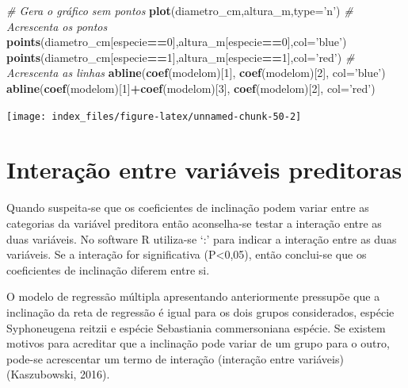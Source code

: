 \documentclass[12pt,brazil,oneside]{book}
\newenvironment{Shaded}{\begin{snugshade}}{\end{snugshade}}
\newcommand{\CommentTok}[1]{\textcolor[rgb]{0.56,0.35,0.01}{\textit{#1}}}
\newcommand{\DataTypeTok}[1]{\textcolor[rgb]{0.13,0.29,0.53}{#1}}
\newcommand{\DecValTok}[1]{\textcolor[rgb]{0.00,0.00,0.81}{#1}}
\newcommand{\KeywordTok}[1]{\textcolor[rgb]{0.13,0.29,0.53}{\textbf{#1}}}
\newcommand{\NormalTok}[1]{#1}
\newcommand{\OperatorTok}[1]{\textcolor[rgb]{0.81,0.36,0.00}{\textbf{#1}}}
\newcommand{\StringTok}[1]{\textcolor[rgb]{0.31,0.60,0.02}{#1}}
\begin{document}
\begin{Shaded}
\begin{Highlighting}[]
\CommentTok{# Gera o gráfico sem pontos}
\KeywordTok{plot}\NormalTok{(diametro_cm,altura_m,}\DataTypeTok{type=}\StringTok{'n'}\NormalTok{) }
\CommentTok{# Acrescenta os pontos}
\KeywordTok{points}\NormalTok{(diametro_cm[especie}\OperatorTok{==}\DecValTok{0}\NormalTok{],altura_m[especie}\OperatorTok{==}\DecValTok{0}\NormalTok{],}\DataTypeTok{col=}\StringTok{'blue'}\NormalTok{)}
\KeywordTok{points}\NormalTok{(diametro_cm[especie}\OperatorTok{==}\DecValTok{1}\NormalTok{],altura_m[especie}\OperatorTok{==}\DecValTok{1}\NormalTok{],}\DataTypeTok{col=}\StringTok{'red'}\NormalTok{)}
\CommentTok{# Acrescenta as linhas}
\KeywordTok{abline}\NormalTok{(}\KeywordTok{coef}\NormalTok{(modelom)[}\DecValTok{1}\NormalTok{], }\KeywordTok{coef}\NormalTok{(modelom)[}\DecValTok{2}\NormalTok{], }\DataTypeTok{col=}\StringTok{'blue'}\NormalTok{)}
\KeywordTok{abline}\NormalTok{(}\KeywordTok{coef}\NormalTok{(modelom)[}\DecValTok{1}\NormalTok{]}\OperatorTok{+}\KeywordTok{coef}\NormalTok{(modelom)[}\DecValTok{3}\NormalTok{], }\KeywordTok{coef}\NormalTok{(modelom)[}\DecValTok{2}\NormalTok{], }\DataTypeTok{col=}\StringTok{'red'}\NormalTok{)}
\end{Highlighting}
\end{Shaded}

\begin{center}\texttt{[image: index\_files/figure-latex/unnamed-chunk-50-2]} \end{center}

\hypertarget{interacao-entre-variaveis-preditoras}{%
\section{Interação entre variáveis preditoras}\label{interacao-entre-variaveis-preditoras}}

Quando suspeita-se que os coeficientes de inclinação podem variar entre as categorias da variável preditora então aconselha-se testar a interação entre as duas variáveis. No software R utiliza-se `:' para indicar a interação entre as duas variáveis. Se a interação for significativa (P\textless{}0,05), então conclui-se que os coeficientes de inclinação diferem entre si.

O modelo de regressão múltipla apresentando anteriormente pressupõe que a inclinação da reta de regressão é igual para os dois grupos considerados, espécie Syphoneugena reitzii e espécie Sebastiania commersoniana espécie. Se existem motivos para acreditar que a inclinação pode variar de um grupo para o outro, pode-se acrescentar um termo de interação (interação entre variáveis) (Kaszubowski, 2016).
\end{document}

